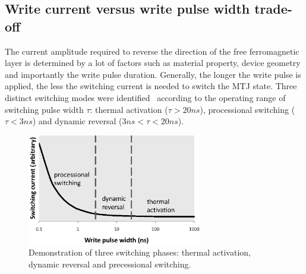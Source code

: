 \subsection{Write current versus write pulse width trade-off}
The current amplitude required to reverse the direction of the free ferromagnetic layer is determined by a lot of factors such as material property, device geometry and importantly the write pulse duration. Generally, the longer the write pulse is applied, the less the switching current is needed to switch the MTJ state. Three distinct switching modes were identified~\cite{STTRAM:JAP07} according to the operating range of switching pulse width $\tau$: thermal activation ($\tau>20ns$), processional switching ($\tau<3ns$) and dynamic reversal ($3ns<\tau<20ns$).

\begin{figure}[t]
  \centering
  \includegraphics[width=3in]{fig/IcWt.eps}
  \caption{Demonstration of three switching phases: thermal activation, dynamic reversal and precessional switching.}
  \label{fig:IcWt}
\end{figure}


